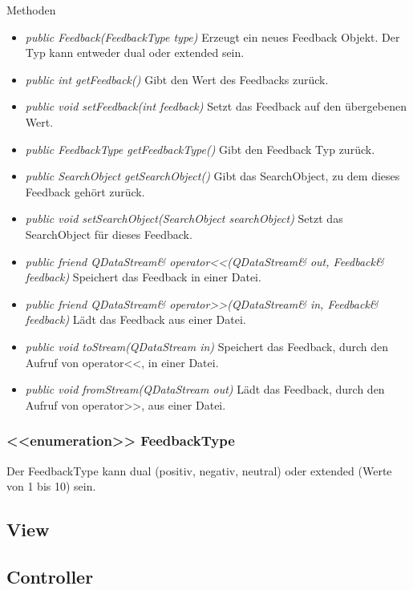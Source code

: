 Methoden
\begin{itemize}
\item \textit{public Feedback(FeedbackType type)} Erzeugt ein neues Feedback Objekt. Der Typ kann entweder dual oder extended sein.
\item \textit{public int getFeedback()} Gibt den Wert des Feedbacks zurück.
\item \textit{public void setFeedback(int feedback)} Setzt das Feedback auf den übergebenen Wert.
\item \textit{public FeedbackType getFeedbackType()} Gibt den Feedback Typ zurück.
\item \textit{public SearchObject getSearchObject()} Gibt das SearchObject, zu dem dieses Feedback gehört zurück.
\item \textit{public void setSearchObject(SearchObject searchObject)} Setzt das SearchObject für dieses Feedback.
\item \textit{public friend QDataStream\& operator<<(QDataStream\& out, Feedback\& feedback)} Speichert das Feedback in einer Datei.
\item \textit{public friend QDataStream\& operator>>(QDataStream\& in, Feedback\& feedback)} Lädt das Feedback aus einer Datei.
\item \textit{public void toStream(QDataStream in)} Speichert das Feedback, durch den Aufruf von operator<<, in einer Datei.
\item \textit{public void fromStream(QDataStream out)} Lädt das Feedback, durch den Aufruf von operator>>, aus einer Datei.
\end{itemize} 

\subsubsection*{<<enumeration>> FeedbackType}
Der FeedbackType kann dual (positiv, negativ, neutral) oder extended (Werte von 1 bis 10) sein.



\subsection{View}

\subsection{Controller}